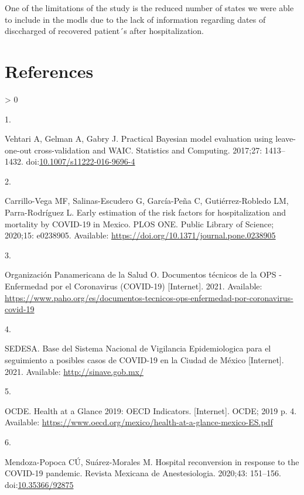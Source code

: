 \documentclass[10pt,letterpaper]{article}
\newlength{\csllabelwidth}
\newlength{\cslhangindent}
\newenvironment{CSLReferences}[3] %
 {%
  \setlength{\parindent}{0pt}
  \ifodd #1 \everypar{\setlength{\hangindent}{\cslhangindent}}\ignorespaces\fi
  \ifnum #2 > 0
  \setlength{\parskip}{#3\baselineskip}
  \fi
 }%
 {}
\newcommand{\CSLLeftMargin}[1]{\parbox[t]{\maxof{\widthof{#1}}{\csllabelwidth}}{#1}}
\newcommand{\CSLRightInline}[1]{\parbox[t]{\linewidth}{#1}}
\begin{document}
One of the  limitations of the study is the reduced number of states
we were able to include in the modls due to the lack of information
regarding dates of disccharged of recovered patient´s after hospitalization.

\hypertarget{references}{%
\section*{References}\label{references}}

\hypertarget{refs}{}
\begin{CSLReferences}{0}{0}
\leavevmode\hypertarget{ref-Vehtari2017}{}%
\CSLLeftMargin{1. }
\CSLRightInline{Vehtari A, Gelman A, Gabry J. {Practical Bayesian model
evaluation using leave-one-out cross-validation and WAIC}. Statistics
and Computing. 2017;27: 1413--1432.
doi:\href{https://doi.org/10.1007/s11222-016-9696-4}{10.1007/s11222-016-9696-4}}

\leavevmode\hypertarget{ref-Carrillo-Vega2020}{}%
\CSLLeftMargin{2. }
\CSLRightInline{Carrillo-Vega MF, Salinas-Escudero G, García-Peña C,
Gutiérrez-Robledo LM, Parra-Rodríguez L. {Early estimation of the risk
factors for hospitalization and mortality by COVID-19 in Mexico}. PLOS
ONE. Public Library of Science; 2020;15: e0238905. Available:
\url{https://doi.org/10.1371/journal.pone.0238905}}

\leavevmode\hypertarget{ref-OrganizacionPanamericanadelaSalud2021}{}%
\CSLLeftMargin{3. }
\CSLRightInline{Organización Panamericana de la Salud O. {Documentos
t{é}cnicos de la OPS - Enfermedad por el Coronavirus (COVID-19)}
{[}Internet{]}. 2021. Available:
\url{https://www.paho.org/es/documentos-tecnicos-ops-enfermedad-por-coronavirus-covid-19}}

\leavevmode\hypertarget{ref-SEDESA2021}{}%
\CSLLeftMargin{4. }
\CSLRightInline{SEDESA. {Base del Sistema Nacional de Vigilancia
Epidemiologica para el seguimiento a posibles casos de COVID-19 en la
Ciudad de M{é}xico} {[}Internet{]}. 2021. Available:
\url{http://sinave.gob.mx/}}

\leavevmode\hypertarget{ref-OCDE2019}{}%
\CSLLeftMargin{5. }
\CSLRightInline{OCDE. {Health at a Glance 2019: OECD Indicators.}
{[}Internet{]}. OCDE; 2019 p. 4. Available:
\url{https://www.oecd.org/mexico/health-at-a-glance-mexico-ES.pdf}}

\leavevmode\hypertarget{ref-Mendoza-Popoca2020}{}%
\CSLLeftMargin{6. }
\CSLRightInline{Mendoza-Popoca CÚ, Suárez-Morales M. {Hospital
reconversion in response to the COVID-19 pandemic}. Revista Mexicana de
Anestesiologia. 2020;43: 151--156.
doi:\href{https://doi.org/10.35366/92875}{10.35366/92875}}


\end{CSLReferences}
\end{document}
